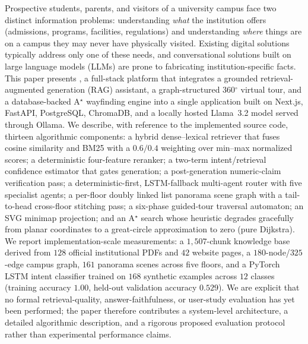 Prospective students, parents, and visitors of a university campus face two
distinct information problems: understanding \emph{what} the institution
offers (admissions, programs, facilities, regulations) and understanding
\emph{where} things are on a campus they may never have physically visited.
Existing digital solutions typically address only one of these needs, and
conversational solutions built on large language models (LLMs) are prone to
fabricating institution-specific facts. This paper presents \system{}, a
full-stack platform that integrates a grounded retrieval-augmented
generation (RAG) assistant, a graph-structured 360$^{\circ}$ virtual tour,
and a database-backed A$^{\star}$ wayfinding engine into a single
application built on Next.js, FastAPI, PostgreSQL, ChromaDB, and a locally
hosted Llama~3.2 model served through Ollama. We describe, with reference to
the implemented source code, thirteen algorithmic components: a hybrid
dense--lexical retriever that fuses  cosine
similarity and BM25 with a $0.6/0.4$ weighting over min--max normalized
scores; a deterministic four-feature reranker; a two-term
intent/retrieval confidence estimator that gates generation; a
post-generation numeric-claim verification pass; a deterministic-first,
LSTM-fallback multi-agent router with five specialist agents; a
per-floor doubly linked list panorama scene graph with a tail-to-head
cross-floor stitching pass; a six-phase guided-tour traversal automaton;
an SVG minimap projection; and an A$^{\star}$ search whose heuristic
degrades gracefully from planar coordinates to a great-circle
approximation to zero (pure Dijkstra). We report implementation-scale
measurements: a $1{,}507$-chunk knowledge base derived from $128$ official
institutional PDFs and $42$ website pages, a $180$-node/$325$-edge campus
graph, $161$ panorama scenes across five floors, and a PyTorch LSTM intent
classifier trained on $168$ synthetic examples across $12$ classes
(training accuracy $1.00$, held-out validation accuracy $0.529$). We are
explicit that no formal retrieval-quality, answer-faithfulness, or
user-study evaluation has yet been performed; the paper therefore
contributes a system-level architecture, a detailed algorithmic
description, and a rigorous proposed evaluation protocol rather than
experimental performance claims.
